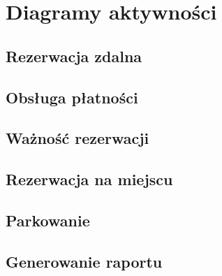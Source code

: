 \newpage
\section{Diagramy aktywności}
\subsection{Rezerwacja zdalna}
\subsection{Obsługa płatności}
\subsection{Ważność rezerwacji}
\subsection{Rezerwacja na miejscu}
\subsection{Parkowanie}
\subsection{Generowanie raportu}
\newpage

\newpage

\newpage

\newpage

\newpage

\newpage
